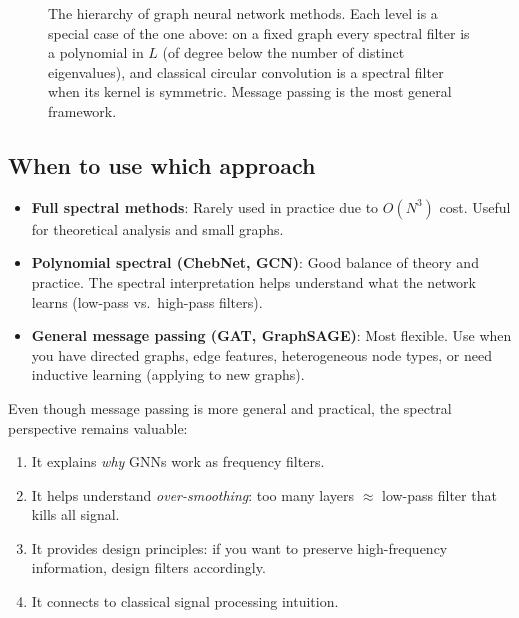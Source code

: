 \begin{notechapter}
\begin{figure}[H]
\begin{tikzpicture}
\end{tikzpicture}
\caption{The hierarchy of graph neural network methods. Each level is
         a special case of the one above: on a fixed graph every spectral filter is a polynomial in $L$ (of degree below the number of distinct eigenvalues), and classical circular convolution is a spectral filter when its kernel is symmetric. Message passing is the most
         general framework.}
\label{dft-to-gnn:fig:hierarchy}
\end{figure}

\subsection{When to use which approach}

\begin{itemize}
    \item \textbf{Full spectral methods}: Rarely used in practice due
          to $O(N^3)$ cost. Useful for theoretical analysis and small
          graphs.

    \item \textbf{Polynomial spectral (ChebNet, GCN)}: Good balance of
          theory and practice. The spectral interpretation helps
          understand what the network learns (low-pass vs.\ high-pass
          filters).

    \item \textbf{General message passing (GAT, GraphSAGE)}: Most
          flexible. Use when you have directed graphs, edge features,
          heterogeneous node types, or need inductive learning (applying
          to new graphs).
\end{itemize}

\begin{remark}
Even though message passing is more general and practical, the spectral
perspective remains valuable:

\begin{enumerate}
    \item It explains \emph{why} GNNs work as frequency filters.
    \item It helps understand \emph{over-smoothing}: too many layers
          $\approx$ low-pass filter that kills all signal.
    \item It provides design principles: if you want to preserve
          high-frequency information, design filters accordingly.
    \item It connects to classical signal processing intuition.
\end{enumerate}


\end{remark}
\end{notechapter}
